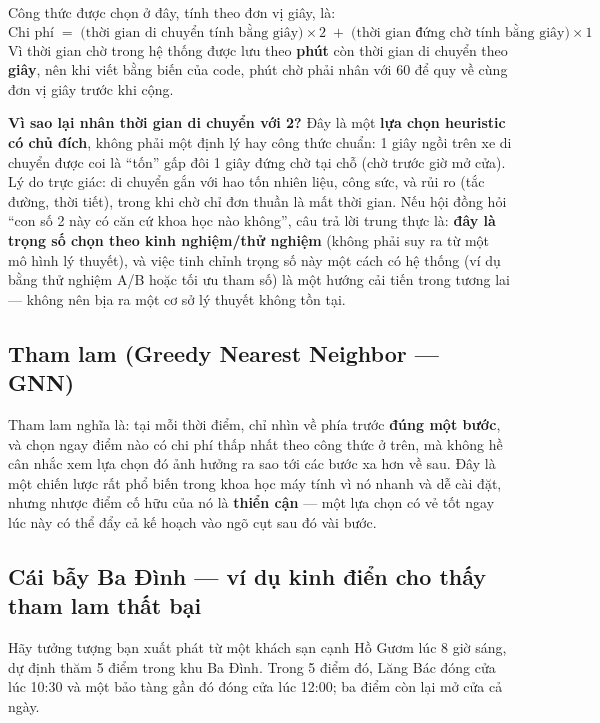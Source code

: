 \documentclass[12pt,a4paper]{article}
\begin{document}
Công thức được chọn ở đây, tính theo đơn vị giây, là:
\[
\text{Chi phí} \;=\; \big(\text{thời gian di chuyển tính bằng giây}\big) \times 2
\;+\; \big(\text{thời gian đứng chờ tính bằng giây}\big) \times 1
\]
Vì thời gian chờ trong hệ thống được lưu theo \textbf{phút} còn thời gian di
chuyển theo \textbf{giây}, nên khi viết bằng biến của code, phút chờ phải nhân
với 60 để quy về cùng đơn vị giây trước khi cộng.

\textbf{Vì sao lại nhân thời gian di chuyển với 2?} Đây là một \textbf{lựa
chọn heuristic có chủ đích}, không phải một định lý hay công thức chuẩn: 1
giây ngồi trên xe di chuyển được coi là ``tốn'' gấp đôi 1 giây đứng chờ tại chỗ
(chờ trước giờ mở cửa). Lý do trực giác: di chuyển gắn với hao tốn nhiên liệu,
công sức, và rủi ro (tắc đường, thời tiết), trong khi chờ chỉ đơn thuần là mất
thời gian. Nếu hội đồng hỏi ``con số 2 này có căn cứ khoa học nào không'',
câu trả lời trung thực là: \textbf{đây là trọng số chọn theo kinh nghiệm/thử
nghiệm} (không phải suy ra từ một mô hình lý thuyết), và việc tinh chỉnh trọng
số này một cách có hệ thống (ví dụ bằng thử nghiệm A/B hoặc tối ưu tham số) là
một hướng cải tiến trong tương lai --- không nên bịa ra một cơ sở lý thuyết
không tồn tại.

\subsection{Tham lam (Greedy Nearest Neighbor --- GNN)}

Tham lam nghĩa là: tại mỗi thời điểm, chỉ nhìn về phía trước \textbf{đúng một
bước}, và chọn ngay điểm nào có chi phí thấp nhất theo công thức ở trên, mà
không hề cân nhắc xem lựa chọn đó ảnh hưởng ra sao tới các bước xa hơn về sau.
Đây là một chiến lược rất phổ biến trong khoa học máy tính vì nó nhanh và dễ
cài đặt, nhưng nhược điểm cố hữu của nó là \textbf{thiển cận} --- một lựa chọn
có vẻ tốt ngay lúc này có thể đẩy cả kế hoạch vào ngõ cụt sau đó vài bước.

\subsection{Cái bẫy Ba Đình --- ví dụ kinh điển cho thấy tham lam thất bại}

Hãy tưởng tượng bạn xuất phát từ một khách sạn cạnh Hồ Gươm lúc 8 giờ sáng, dự
định thăm 5 điểm trong khu Ba Đình. Trong 5 điểm đó, Lăng Bác đóng cửa lúc
10:30 và một bảo tàng gần đó đóng cửa lúc 12:00; ba điểm còn lại mở cửa cả
ngày.
\end{document}
